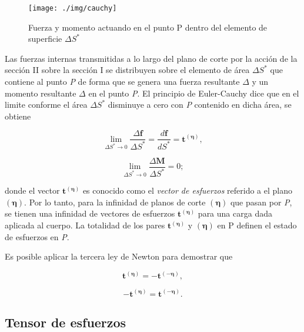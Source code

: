 \documentclass{article}
\begin{document}
    \begin{figure}[H]
        \centering
        \texttt{[image: ./img/cauchy]}
        \caption{Fuerza y momento actuando en el punto P dentro del elemento de superficie $\Delta S^*$}
        \label{fig:cauchy}
    \end{figure}

    Las fuerzas internas transmitidas a lo largo del plano de corte por la acción de
    la sección II sobre la sección I se distribuyen sobre el elemento de área
    $\Delta S^{*}$ que contiene al punto \textit{P} de forma que se genera una fuerza 
    resultante $\Delta$ y un momento resultante $\Delta$ en el punto 
    \textit{P}. El principio de Euler-Cauchy dice que en el limite conforme el área
    $\Delta S^{*}$ disminuye a cero con \textit{P} contenido en dicha área, se obtiene

    \begin{equation}
        \lim_{\Delta S^{*} \to 0} \frac{\Delta \bm{f}}{\Delta S^{*}} =
        \frac{d \bm{f}}{dS^{*}} =
        \bm{t^{\bm{(\eta)}}},
    \end{equation}

    \begin{equation}
        \lim_{\Delta S^{*} \to 0} \frac{\Delta \bm{M}}{\Delta S^{*}} = 0;
    \end{equation}

    donde el vector $\bm{t^{\bm{(\eta)}}}$ es conocido como el \textit{vector de esfuerzos}
    referido a el plano $\bm{(\eta)}$.
    Por lo tanto, para la infinidad de planos de corte $\bm{(\eta)}$ que pasan por \textit{P},
    se tienen una infinidad de vectores de esfuerzos $\bm{t^{\bm{(\eta)}}}$ para una carga
    dada aplicada al cuerpo. La totalidad de los pares $\bm{t^{\bm{(\eta)}}}$ y $\bm{(\eta)}$
    en P definen el estado de esfuerzos en \textit{P}.

    Es posible aplicar la tercera ley de Newton para demostrar que

    \begin{equation}
        \bm{t^{\bm{(\eta)}}} = - \bm{t^{\bm{(-\eta)}}},
    \end{equation}

    \begin{equation}
        -\bm{t^{\bm{(\eta)}}} = \bm{t^{\bm{(-\eta)}}}.
    \end{equation}

    \subsection{Tensor de esfuerzos}
\end{document}
